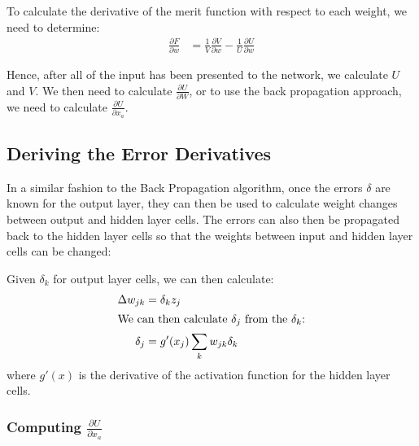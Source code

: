 \documentclass[a4paper]{article}
\newcommand{\pdiff}[2]{ \frac{\partial #1}{\partial #2}}
\begin{document}
To calculate the derivative of the merit function with respect to each
weight, we need to determine:
\begin{align*}
\pdiff{F}{w} &= \frac{1}{V} \pdiff{V}{w} - \frac{1}{U} \pdiff{U}{w}
\end{align*}

Hence, after all of the input has been presented to the network, we
calculate $U$ and $V$.  We then need to calculate $\pdiff{U}{W}$, or
to use the back propagation approach, we need to calculate
$\pdiff{U}{x_a}$.




\subsection{Deriving the Error Derivatives}

In a similar fashion to the Back Propagation algorithm, once the
errors $\delta$ are known for the output layer, they can then be used
to calculate weight changes between output and hidden layer cells. The
errors can also then be propagated back to the hidden layer cells so
that the weights between input and hidden layer cells can be changed:

Given $\delta_k$ for output layer cells, we can then calculate:
\begin{align*}
\Delta w_{jk} & = \delta_k z_j \\
\intertext{We can then calculate $\delta_j$ from the $\delta_k$:}
\delta_j &= g'(x_j) \sum_{k} w_{jk} \delta_k
\end{align*}
where $g'(x)$ is the derivative of the activation function for the
hidden layer cells.



\subsubsection{Computing $\pdiff{U}{x_a}$}
\end{document}
